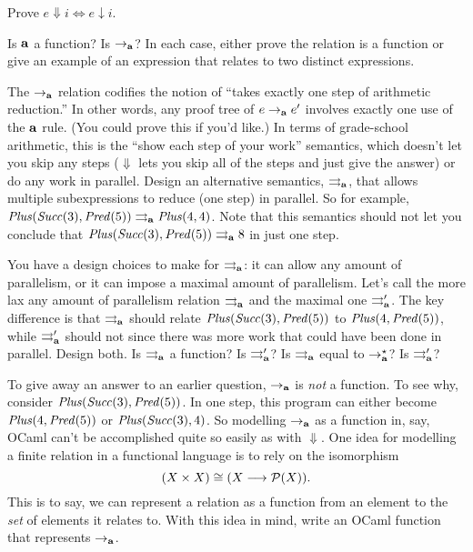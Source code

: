 
\begin{exercise}
Prove $e \Downarrow i \iff e \downarrow i$.
\end{exercise}

\begin{exercise}
Is $\mathop{\mathbf{a}}$ a function?  Is $\rightarrow_\mathbf{a}$?  In each case, either
  prove the relation is a function or give an example of an expression
  that relates to two distinct expressions.
\end{exercise}

\begin{exercise}
The $\rightarrow_\mathbf{a}$ relation codifies the notion of ``takes exactly one step
of arithmetic reduction.'' In other words, any proof tree of $e \rightarrow_\mathbf{a}
e'$ involves exactly one use of the $\mathop{\mathbf{a}}$ rule. (You could prove
this if you'd like.)  In terms of grade-school arithmetic, this is the
``show each step of your work'' semantics, which doesn't let you skip
any steps ($\Downarrow$ lets you skip all of the steps and just give
the answer) or do any work in parallel.  Design an alternative
semantics, $\rightrightarrows_\mathbf{a}$, that allows multiple subexpressions to
reduce (one step) in parallel.
  So for example, $\mathit{Plus}(\mathit{Succ}(3),\mathit{Pred}(5))
  \rightrightarrows_\mathbf{a} \mathit{Plus}(4,4)$.
  Note that this semantics should not let you conclude that
  $\mathit{Plus}(\mathit{Succ}(3),\mathit{Pred}(5)) \rightrightarrows_\mathbf{a} 8$
  in just one step.

  You have a design choices to make for $\rightrightarrows_\mathbf{a}$: it can allow
  any amount of parallelism, or it can impose a maximal amount of parallelism.
  Let's call the more lax any amount of parallelism relation
  $\rightrightarrows_\mathbf{a}$ and the maximal one $\rightrightarrows'_\mathbf{a}$.  The key difference
  is that $\rightrightarrows_\mathbf{a}$ should relate
  $\mathit{Plus}(\mathit{Succ}(3),\mathit{Pred}(5))$ to
  $\mathit{Plus}(4,\mathit{Pred}(5))$, while $\rightrightarrows'_\mathbf{a}$ should not
  since there was more work that could have been done in parallel.
  Design both.  Is $\rightrightarrows_\mathbf{a}$ a function?  Is $\rightrightarrows'_\mathbf{a}$?
  Is $\rightrightarrows_\mathbf{a}$ equal to $\rightarrow^\star_\mathbf{a}$?  Is $\rightrightarrows'_\mathbf{a}$?
\end{exercise}

\begin{exercise}
To give away an answer to an earlier question, $\rightarrow_\mathbf{a}$ is \emph{not} a
function.  To see why, consider $\mathit{Plus}(\mathit{Succ}(3),\mathit{Pred}(5))$.  In one
step, this program can either become $\mathit{Plus}(4,\mathit{Pred}(5))$ or
$\mathit{Plus}(\mathit{Succ}(3),4)$.  So modelling $\rightarrow_\mathbf{a}$ as a function in, say,
OCaml can't be accomplished quite so easily as with $\Downarrow$.  One
idea for modelling a finite relation in a functional language is to
rely on the isomorphism 
\[
(X \times X) \cong (X \longrightarrow \mathcal{P}(X))\text.
\]
This is to say, we can represent a relation as a function from
an element to the \emph{set} of elements it relates to.
%
With this idea in mind, write an OCaml function  that
represents $\rightarrow_\mathbf{a}$.
\end{exercise}

